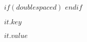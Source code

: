 \clearpage
{} %
$if(doublespaced)$
\doublespacing
$endif$
\small\normalsize
\hbox{\ }
 
\vspace{.5in}

\begin{center}
\large{$it.key$} 
\end{center} 

\vspace{1ex}

$it.value$
